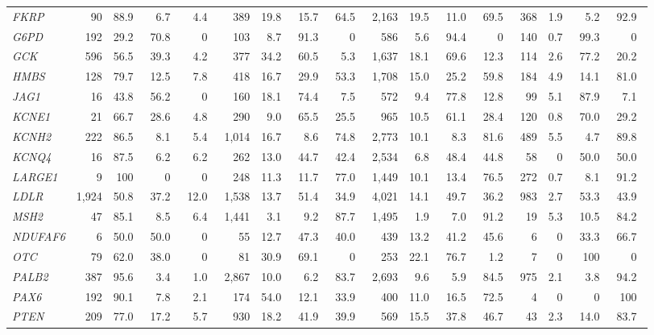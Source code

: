 \begin{tabular}{@{}l rrrr rrrr rrrr rrrr@{}}
\textit{FKRP} & 90 & 88.9\ & 6.7\ & 4.4\ & 389 & 19.8\ & 15.7\ & 64.5\ & 2,163 & 19.5\ & 11.0\ & 69.5\ & 368 & 1.9\ & 5.2\ & 92.9\ \\
\textit{G6PD} & 192 & 29.2\ & 70.8\ & 0\ & 103 & 8.7\ & 91.3\ & 0\ & 586 & 5.6\ & 94.4\ & 0\ & 140 & 0.7\ & 99.3\ & 0\ \\
\textit{GCK} & 596 & 56.5\ & 39.3\ & 4.2\ & 377 & 34.2\ & 60.5\ & 5.3\ & 1,637 & 18.1\ & 69.6\ & 12.3\ & 114 & 2.6\ & 77.2\ & 20.2\ \\
\textit{HMBS} & 128 & 79.7\ & 12.5\ & 7.8\ & 418 & 16.7\ & 29.9\ & 53.3\ & 1,708 & 15.0\ & 25.2\ & 59.8\ & 184 & 4.9\ & 14.1\ & 81.0\ \\
\textit{JAG1} & 16 & 43.8\ & 56.2\ & 0\ & 160 & 18.1\ & 74.4\ & 7.5\ & 572 & 9.4\ & 77.8\ & 12.8\ & 99 & 5.1\ & 87.9\ & 7.1\ \\
\textit{KCNE1} & 21 & 66.7\ & 28.6\ & 4.8\ & 290 & 9.0\ & 65.5\ & 25.5\ & 965 & 10.5\ & 61.1\ & 28.4\ & 120 & 0.8\ & 70.0\ & 29.2\ \\
\textit{KCNH2} & 222 & 86.5\ & 8.1\ & 5.4\ & 1,014 & 16.7\ & 8.6\ & 74.8\ & 2,773 & 10.1\ & 8.3\ & 81.6\ & 489 & 5.5\ & 4.7\ & 89.8\ \\
\textit{KCNQ4} & 16 & 87.5\ & 6.2\ & 6.2\ & 262 & 13.0\ & 44.7\ & 42.4\ & 2,534 & 6.8\ & 48.4\ & 44.8\ & 58 & 0\ & 50.0\ & 50.0\ \\
\textit{LARGE1} & 9 & 100\ & 0\ & 0\ & 248 & 11.3\ & 11.7\ & 77.0\ & 1,449 & 10.1\ & 13.4\ & 76.5\ & 272 & 0.7\ & 8.1\ & 91.2\ \\
\textit{LDLR} & 1,924 & 50.8\ & 37.2\ & 12.0\ & 1,538 & 13.7\ & 51.4\ & 34.9\ & 4,021 & 14.1\ & 49.7\ & 36.2\ & 983 & 2.7\ & 53.3\ & 43.9\ \\
\textit{MSH2} & 47 & 85.1\ & 8.5\ & 6.4\ & 1,441 & 3.1\ & 9.2\ & 87.7\ & 1,495 & 1.9\ & 7.0\ & 91.2\ & 19 & 5.3\ & 10.5\ & 84.2\ \\
\textit{NDUFAF6} & 6 & 50.0\ & 50.0\ & 0\ & 55 & 12.7\ & 47.3\ & 40.0\ & 439 & 13.2\ & 41.2\ & 45.6\ & 6 & 0\ & 33.3\ & 66.7\ \\
\textit{OTC} & 79 & 62.0\ & 38.0\ & 0\ & 81 & 30.9\ & 69.1\ & 0\ & 253 & 22.1\ & 76.7\ & 1.2\ & 7 & 0\ & 100\ & 0\ \\
\textit{PALB2} & 387 & 95.6\ & 3.4\ & 1.0\ & 2,867 & 10.0\ & 6.2\ & 83.7\ & 2,693 & 9.6\ & 5.9\ & 84.5\ & 975 & 2.1\ & 3.8\ & 94.2\ \\
\textit{PAX6} & 192 & 90.1\ & 7.8\ & 2.1\ & 174 & 54.0\ & 12.1\ & 33.9\ & 400 & 11.0\ & 16.5\ & 72.5\ & 4 & 0\ & 0\ & 100\ \\
\textit{PTEN} & 209 & 77.0\ & 17.2\ & 5.7\ & 930 & 18.2\ & 41.9\ & 39.9\ & 569 & 15.5\ & 37.8\ & 46.7\ & 43 & 2.3\ & 14.0\ & 83.7\ \\

\end{tabular}
